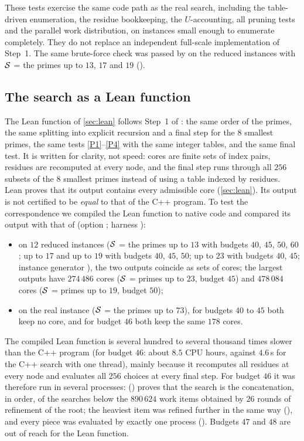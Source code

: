 \documentclass[11pt]{article}
\begin{document}
These tests exercise the same code path as the real search, including the table-driven enumeration, the residue bookkeeping, the $U$-accounting, all pruning tests and the parallel work distribution, on instances small enough to enumerate completely. They do not replace an independent full-scale implementation of Step~1.
The same brute-force check was passed by  on the reduced instances with $\mathcal{S}$ = the primes up to $13$, $17$ and $19$ ().

\subsection{The search as a Lean function}\label{sec:leanrun}

The Lean function  of \cref{sec:lean} follows Step~1 of : the same order of the primes, the same splitting into explicit recursion and a final step for the $8$ smallest primes, the same tests \ref{P1}--\ref{P4} with the same integer tables, and the same final test. It is written for clarity, not speed: cores are finite sets of index pairs, residues are recomputed at every node, and the final step runs through all $256$ subsets of the $8$ smallest primes instead of using a table indexed by residues.
Lean proves that its output contains every admissible core (\cref{sec:lean}). Its output is not certified to be \emph{equal} to that of the C++ program. To test the correspondence we compiled the Lean function to native code and compared its output with that of  (option ; harness ):
\begin{itemize}
\item on $12$ reduced instances ($\mathcal{S}$ = the primes up to $13$ with budgets $40$, $45$, $50$, $60$; up to $17$ and up to $19$ with budgets $40$, $45$, $50$; up to $23$ with budgets $40$, $45$; instance generator ), the two outputs coincide as sets of cores; the largest outputs have $274\,486$ cores ($\mathcal{S}$ = primes up to $23$, budget $45$) and $478\,084$ cores ($\mathcal{S}$ = primes up to $19$, budget $50$);
\item on the real instance ($\mathcal{S}$ = the primes up to $73$), for budgets $40$ to $45$ both keep no core, and for budget $46$ both keep the same $178$ cores.
\end{itemize}
The compiled Lean function is several hundred to several thousand times slower than the C++ program (for budget $46$: about $8.5$ CPU hours, against $4.6$\,s for the C++ search with one thread), mainly because it recomputes all residues at every node and evaluates all $256$ choices at every final step. For budget $46$ it was therefore run in several processes:  () proves that the search is the concatenation, in order, of the searches below the $890\,624$ work items obtained by $26$ rounds of refinement of the root; the heaviest item was refined further in the same way (), and every piece was evaluated by exactly one process (). Budgets $47$ and $48$ are out of reach for the Lean function.
\end{document}
